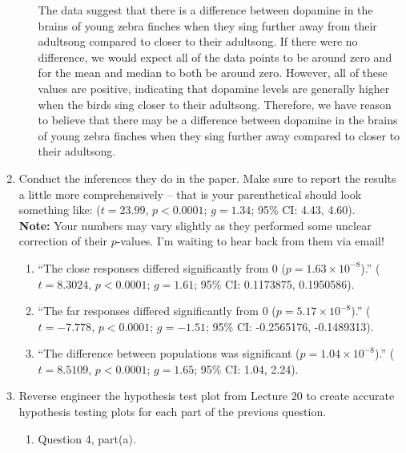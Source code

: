 \documentclass{article}\usepackage[]{graphicx}\usepackage[]{xcolor}
\newenvironment{knitrout}{}{} %
\begin{document}
\begin{enumerate}
\begin{enumerate}
The data suggest that there is a difference between dopamine in the brains of young zebra finches when they sing further away from their adultsong compared to closer to their adultsong. If there were no difference, we would expect all of the data points to be around zero and for the mean and median to both be around zero. However, all of these values are positive, indicating that dopamine levels are generally higher when the birds sing closer to their adultsong. Therefore, we have reason to believe that there may be a difference between dopamine in the brains of young zebra finches when they sing further away compared to closer to their adultsong.
\end{enumerate}
\item Conduct the inferences they do in the paper. Make sure to report the results
a little more comprehensively -- that is your parenthetical should look something
like: ($t=23.99$, $p<0.0001$; $g=1.34$; 95\% CI: 4.43, 4.60).\\
\textbf{Note:} Your numbers may vary slightly as they performed some unclear
correction of their $p$-values. I'm waiting to hear back from them via email!
\begin{enumerate}
  \item ``The close responses differed significantly from 0 ($p=1.63 \times 10^{-8}$).''
\newline ($t=8.3024$, $p<0.0001$; $g=1.61$; 95\% CI: 0.1173875, 0.1950586).
  \item ``The far responses differed significantly from 0 ($p=5.17 \times 10^{-8}$).''
\newline ($t=-7.778$, $p<0.0001$; $g=-1.51$; 95\% CI: -0.2565176, -0.1489313).
  \item ``The difference between populations was significant ($p=1.04 \times10^{-8}$).''
\newline ($t=8.5109$, $p<0.0001$; $g=1.65$; 95\% CI: 1.04, 2.24).
\end{enumerate}
\newpage
\item Reverse engineer the hypothesis test plot from Lecture 20 to create accurate
hypothesis testing plots for each part of the previous question.
\begin{enumerate}
  \item Question 4, part(a).
\begin{knitrout}
\color{fgcolor}


\end{knitrout}
\end{enumerate}
\end{enumerate}
\end{document}
